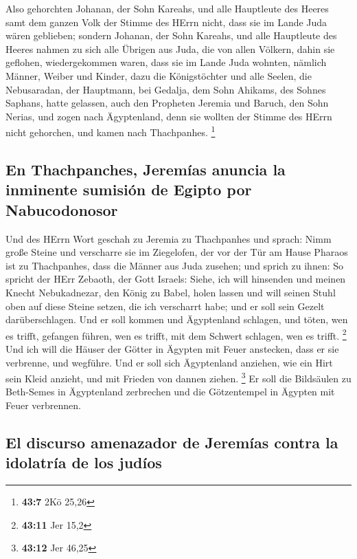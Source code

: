  Also gehorchten Johanan, der Sohn Kareahs, und alle
Hauptleute des Heeres samt dem ganzen Volk der Stimme des HErrn nicht,
dass sie im Lande Juda wären geblieben;  sondern Johanan,
der Sohn Kareahs, und alle Hauptleute des Heeres nahmen zu sich alle
Übrigen aus Juda, die von allen Völkern, dahin sie geflohen,
wiedergekommen waren, dass sie im Lande Juda wohnten, 
nämlich Männer, Weiber und Kinder, dazu die Königstöchter und alle
Seelen, die Nebusaradan, der Hauptmann, bei Gedalja, dem Sohn Ahikams,
des Sohnes Saphans, hatte gelassen, auch den Propheten Jeremia und
Baruch, den Sohn Nerias,  und zogen nach Ägyptenland, denn
sie wollten der Stimme des HErrn nicht gehorchen, und kamen nach
Thachpanhes. \footnote{\textbf{43:7} 2Kö 25,26}

\hypertarget{en-thachpanches-jeremuxedas-anuncia-la-inminente-sumisiuxf3n-de-egipto-por-nabucodonosor}{%
\subsection{En Thachpanches, Jeremías anuncia la inminente sumisión de
Egipto por
Nabucodonosor}\label{en-thachpanches-jeremuxedas-anuncia-la-inminente-sumisiuxf3n-de-egipto-por-nabucodonosor}}

 Und des HErrn Wort geschah zu Jeremia zu Thachpanhes und
sprach:  Nimm große Steine und verscharre sie im
Ziegelofen, der vor der Tür am Hause Pharaos ist zu Thachpanhes, dass
die Männer aus Juda zusehen;  und sprich zu ihnen: So
spricht der HErr Zebaoth, der Gott Israels: Siehe, ich will hinsenden
und meinen Knecht Nebukadnezar, den König zu Babel, holen lassen und
will seinen Stuhl oben auf diese Steine setzen, die ich verscharrt habe;
und er soll sein Gezelt darüberschlagen.  Und er soll
kommen und Ägyptenland schlagen, und töten, wen es trifft, gefangen
führen, wen es trifft, mit dem Schwert schlagen, wen es trifft.
\footnote{\textbf{43:11} Jer 15,2}  Und ich will die
Häuser der Götter in Ägypten mit Feuer anstecken, dass er sie verbrenne,
und wegführe. Und er soll sich Ägyptenland anziehen, wie ein Hirt sein
Kleid anzieht, und mit Frieden von dannen ziehen. \footnote{\textbf{43:12}
  Jer 46,25}  Er soll die Bildsäulen zu Beth-Semes in
Ägyptenland zerbrechen und die Götzentempel in Ägypten mit Feuer
verbrennen.

\hypertarget{el-discurso-amenazador-de-jeremuxedas-contra-la-idolatruxeda-de-los-juduxedos}{%
\subsection{El discurso amenazador de Jeremías contra la idolatría de
los
judíos}\label{el-discurso-amenazador-de-jeremuxedas-contra-la-idolatruxeda-de-los-juduxedos}}


